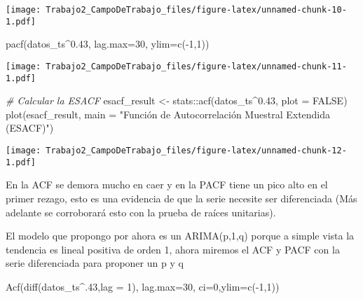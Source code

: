 \documentclass[
]{article}
\newenvironment{Shaded}{\begin{snugshade}}{\end{snugshade}}
\newcommand{\AttributeTok}[1]{\textcolor[rgb]{0.77,0.63,0.00}{#1}}
\newcommand{\CommentTok}[1]{\textcolor[rgb]{0.56,0.35,0.01}{\textit{#1}}}
\newcommand{\ConstantTok}[1]{\textcolor[rgb]{0.00,0.00,0.00}{#1}}
\newcommand{\DecValTok}[1]{\textcolor[rgb]{0.00,0.00,0.81}{#1}}
\newcommand{\FloatTok}[1]{\textcolor[rgb]{0.00,0.00,0.81}{#1}}
\newcommand{\FunctionTok}[1]{\textcolor[rgb]{0.00,0.00,0.00}{#1}}
\newcommand{\NormalTok}[1]{#1}
\newcommand{\OtherTok}[1]{\textcolor[rgb]{0.56,0.35,0.01}{#1}}
\newcommand{\SpecialCharTok}[1]{\textcolor[rgb]{0.00,0.00,0.00}{#1}}
\newcommand{\StringTok}[1]{\textcolor[rgb]{0.31,0.60,0.02}{#1}}
\begin{document}
\texttt{[image: Trabajo2\_CampoDeTrabajo\_files/figure-latex/unnamed-chunk-10-1.pdf]}

\begin{Shaded}
\begin{Highlighting}[]
\FunctionTok{pacf}\NormalTok{(datos\_ts}\SpecialCharTok{\^{}}\FloatTok{0.43}\NormalTok{, }\AttributeTok{lag.max=}\DecValTok{30}\NormalTok{, }\AttributeTok{ylim=}\FunctionTok{c}\NormalTok{(}\SpecialCharTok{{-}}\DecValTok{1}\NormalTok{,}\DecValTok{1}\NormalTok{))}
\end{Highlighting}
\end{Shaded}

\texttt{[image: Trabajo2\_CampoDeTrabajo\_files/figure-latex/unnamed-chunk-11-1.pdf]}

\begin{Shaded}
\begin{Highlighting}[]
\CommentTok{\# Calcular la ESACF}
\NormalTok{esacf\_result }\OtherTok{\textless{}{-}}\NormalTok{ stats}\SpecialCharTok{::}\FunctionTok{acf}\NormalTok{(datos\_ts}\SpecialCharTok{\^{}}\FloatTok{0.43}\NormalTok{, }\AttributeTok{plot =} \ConstantTok{FALSE}\NormalTok{)}
\FunctionTok{plot}\NormalTok{(esacf\_result, }\AttributeTok{main =} \StringTok{"Función de Autocorrelación Muestral Extendida (ESACF)"}\NormalTok{)}
\end{Highlighting}
\end{Shaded}

\texttt{[image: Trabajo2\_CampoDeTrabajo\_files/figure-latex/unnamed-chunk-12-1.pdf]}

En la ACF se demora mucho en caer y en la PACF tiene un pico alto en el
primer rezago, esto es una evidencia de que la serie necesite ser
diferenciada (Más adelante se corroborará esto con la prueba de raíces
unitarias).

El modelo que propongo por ahora es un ARIMA(p,1,q) porque a simple
vista la tendencia es lineal positiva de orden 1, ahora miremos el ACF y
PACF con la serie diferenciada para proponer un p y q

\begin{Shaded}
\begin{Highlighting}[]
\FunctionTok{Acf}\NormalTok{(}\FunctionTok{diff}\NormalTok{(datos\_ts}\SpecialCharTok{\^{}}\NormalTok{.}\DecValTok{43}\NormalTok{,}\AttributeTok{lag =} \DecValTok{1}\NormalTok{), }\AttributeTok{lag.max=}\DecValTok{30}\NormalTok{, }\AttributeTok{ci=}\DecValTok{0}\NormalTok{,}\AttributeTok{ylim=}\FunctionTok{c}\NormalTok{(}\SpecialCharTok{{-}}\DecValTok{1}\NormalTok{,}\DecValTok{1}\NormalTok{))}
\end{Highlighting}
\end{Shaded}
\end{document}

